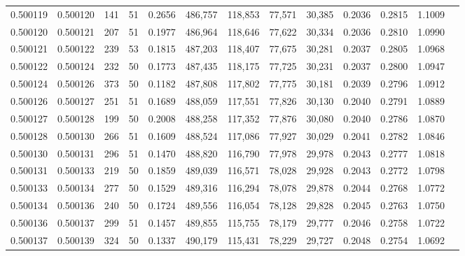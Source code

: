 \begin{tabular}{rrrrrrrrrrrrr}
0.500119 & 0.500120 & 141 &  51 &                                     0.2656 & 486,757 & 118,853 &  77,571 &  30,385 & 0.2036 & 0.2815 & 1.1009 \\
0.500120 & 0.500121 & 207 &  51 &                                     0.1977 & 486,964 & 118,646 &  77,622 &  30,334 & 0.2036 & 0.2810 & 1.0990 \\
0.500121 & 0.500122 & 239 &  53 &                                     0.1815 & 487,203 & 118,407 &  77,675 &  30,281 & 0.2037 & 0.2805 & 1.0968 \\
0.500122 & 0.500124 & 232 &  50 &                                     0.1773 & 487,435 & 118,175 &  77,725 &  30,231 & 0.2037 & 0.2800 & 1.0947 \\
0.500124 & 0.500126 & 373 &  50 &                                     0.1182 & 487,808 & 117,802 &  77,775 &  30,181 & 0.2039 & 0.2796 & 1.0912 \\
0.500126 & 0.500127 & 251 &  51 &                                     0.1689 & 488,059 & 117,551 &  77,826 &  30,130 & 0.2040 & 0.2791 & 1.0889 \\
0.500127 & 0.500128 & 199 &  50 &                                     0.2008 & 488,258 & 117,352 &  77,876 &  30,080 & 0.2040 & 0.2786 & 1.0870 \\
0.500128 & 0.500130 & 266 &  51 &                                     0.1609 & 488,524 & 117,086 &  77,927 &  30,029 & 0.2041 & 0.2782 & 1.0846 \\
0.500130 & 0.500131 & 296 &  51 &                                     0.1470 & 488,820 & 116,790 &  77,978 &  29,978 & 0.2043 & 0.2777 & 1.0818 \\
0.500131 & 0.500133 & 219 &  50 &                                     0.1859 & 489,039 & 116,571 &  78,028 &  29,928 & 0.2043 & 0.2772 & 1.0798 \\
0.500133 & 0.500134 & 277 &  50 &                                     0.1529 & 489,316 & 116,294 &  78,078 &  29,878 & 0.2044 & 0.2768 & 1.0772 \\
0.500134 & 0.500136 & 240 &  50 &                                     0.1724 & 489,556 & 116,054 &  78,128 &  29,828 & 0.2045 & 0.2763 & 1.0750 \\
0.500136 & 0.500137 & 299 &  51 &                                     0.1457 & 489,855 & 115,755 &  78,179 &  29,777 & 0.2046 & 0.2758 & 1.0722 \\
0.500137 & 0.500139 & 324 &  50 &                                     0.1337 & 490,179 & 115,431 &  78,229 &  29,727 & 0.2048 & 0.2754 & 1.0692 \\

\end{tabular}
